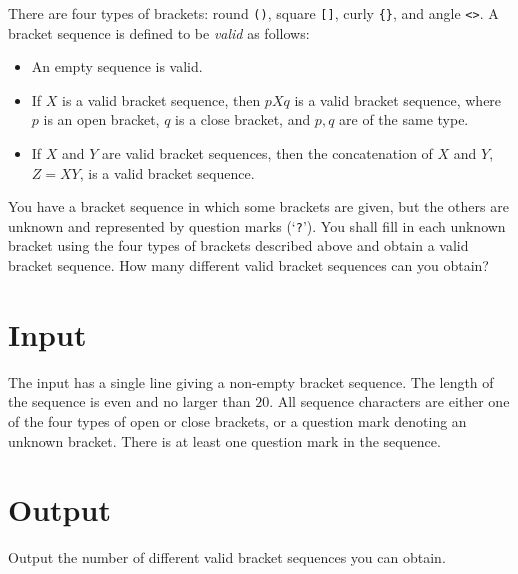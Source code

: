
There are four types of brackets: round {\tt ()}, square {\tt []}, curly {\tt \{\}}, and angle {\tt <>}.  A bracket sequence is defined to be {\it valid} as follows:
\begin{itemize}
\item An empty sequence is valid.
\item If $X$ is a valid bracket sequence, then $pXq$ is a valid bracket sequence, where $p$ is an open bracket, $q$ is a close bracket, and $p, q$ are of the same type.
\item If $X$ and $Y$ are valid bracket sequences, then the concatenation of $X$ and $Y$, $Z = XY$, is a valid bracket sequence.
\end{itemize}

You have a bracket sequence in which some brackets are given, but the others are unknown and represented by question marks (`{\tt ?}').
You shall fill in each unknown bracket using the four types of brackets described above and obtain a valid bracket sequence.
How many different valid bracket sequences can you obtain?

\section*{Input}
The input has a single line giving a non-empty bracket sequence.
The length of the sequence is even and no larger than $20$.
All sequence characters are either one of the four types of open or close brackets, or a question mark denoting an unknown bracket.
There is at least one question mark in the sequence.

\section*{Output}
Output the number of different valid bracket sequences you can obtain.
